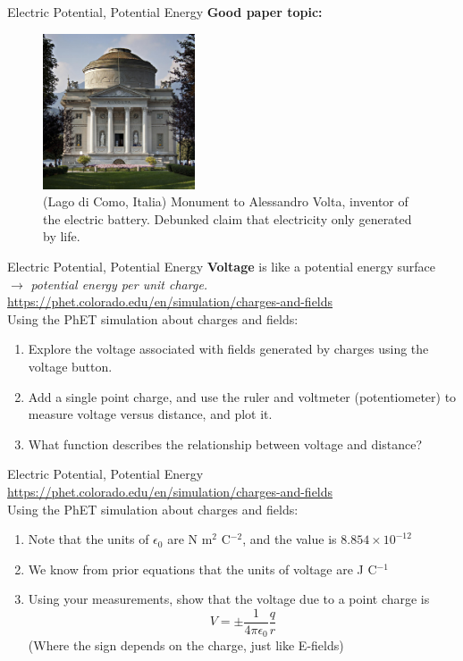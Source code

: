 \documentclass{beamer}
\begin{document}
\begin{frame}{Electric Potential, Potential Energy}
\textbf{Good paper topic:}
\begin{figure}
\centering
\includegraphics[width=0.4\textwidth]{figures/volta.jpg}
\caption{\label{fig:volta} \small (Lago di Como, Italia) Monument to Alessandro Volta, inventor of the electric battery.  Debunked claim that electricity only generated by life.}
\end{figure}
\end{frame}

\begin{frame}{Electric Potential, Potential Energy}
\textbf{Voltage} is like a potential energy surface $\rightarrow$ \textit{potential energy per unit charge.} \\ \vspace{0.5cm}
\url{https://phet.colorado.edu/en/simulation/charges-and-fields} \\
\alert{Using the PhET simulation about charges and fields}:
\begin{enumerate}
\item Explore the voltage associated with fields generated by charges using the voltage button.
\item Add a single point charge, and use the ruler and voltmeter (potentiometer) to measure voltage versus distance, and plot it.
\item What function describes the relationship between voltage and distance?
\end{enumerate}
\end{frame}

\begin{frame}{Electric Potential, Potential Energy}
\url{https://phet.colorado.edu/en/simulation/charges-and-fields} \\
\alert{Using the PhET simulation about charges and fields}:
\begin{enumerate}
\item Note that the units of $\epsilon_0$ are N m$^2$ C$^{-2}$, and the value is $8.854\times 10^{-12}$
\item We know from prior equations that the units of voltage are J C$^{-1}$
\item Using your measurements, show that the voltage due to a point charge is
\begin{equation}
\boxed{
V = \pm \frac{1}{4\pi \epsilon_0} \frac{q}{r}}
\end{equation}
(Where the sign depends on the charge, just like E-fields)
\end{enumerate}
\end{frame}
\end{document}
